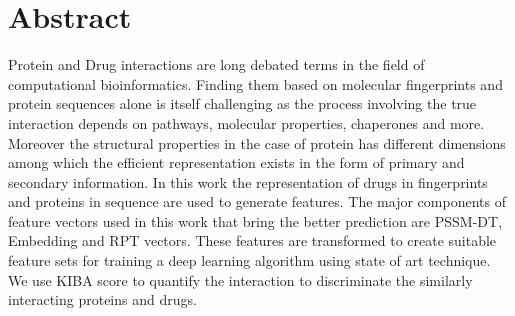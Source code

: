 

\chapter*{Abstract}
Protein and Drug interactions are long debated terms in the field of computational bioinformatics. Finding them based on molecular fingerprints and protein sequences alone is itself challenging as the process involving the true interaction depends on pathways, molecular properties, chaperones and more. Moreover the structural properties in the case of protein has different dimensions among which the efficient representation exists in the form of primary and secondary information. In this work the representation of drugs in fingerprints and proteins in sequence are used to generate features. The major components of feature vectors used in this work that bring the better prediction are PSSM-DT, Embedding and RPT vectors. These features are transformed to create suitable feature sets for training a deep learning algorithm using state of art technique. We use KIBA score to quantify the interaction to discriminate the similarly interacting proteins and drugs.